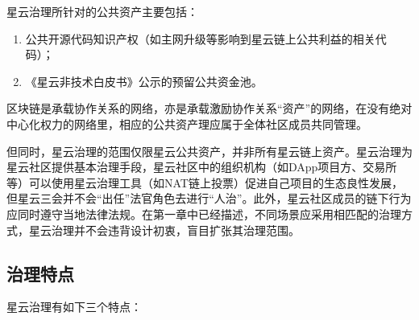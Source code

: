 星云治理所针对的公共资产主要包括：

\begin{enumerate}
	\item 公共开源代码知识产权（如主网升级等影响到星云链上公共利益的相关代码）；
	\item 《星云非技术白皮书》公示的预留公共资金池。
\end{enumerate}

区块链是承载协作关系的网络，亦是承载激励协作关系“资产”的网络，在没有绝对中心化权力的网络里，相应的公共资产理应属于全体社区成员共同管理。

但同时，星云治理的范围仅限星云公共资产，并非所有星云链上资产。星云治理为星云社区提供基本治理手段，星云社区中的组织机构（如DApp项目方、交易所等）可以使用星云治理工具（如NAT链上投票）促进自己项目的生态良性发展，但星云三会并不会“出任”法官角色去进行“人治”。此外，星云社区成员的链下行为应同时遵守当地法律法规。在第一章中已经描述，不同场景应采用相匹配的治理方式，星云治理并不会违背设计初衷，盲目扩张其治理范围。

\subsection{治理特点}

星云治理有如下三个特点：

